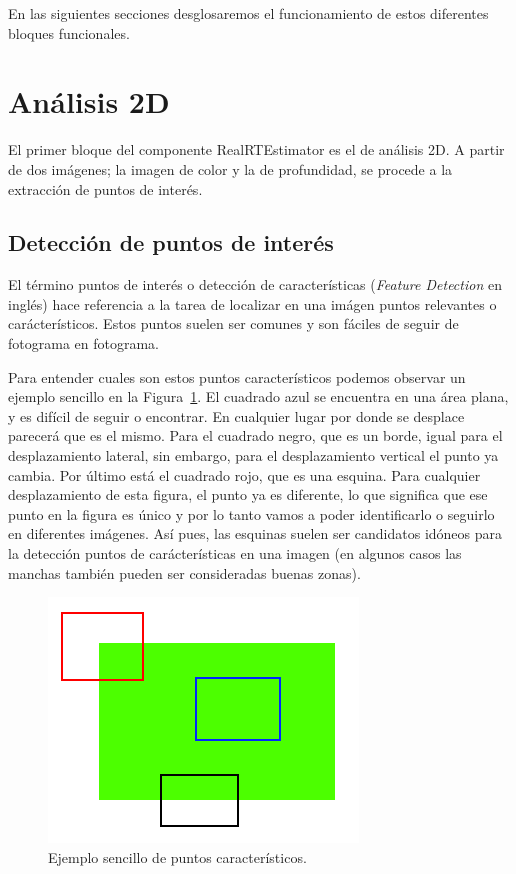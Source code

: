 En las siguientes secciones desglosaremos el funcionamiento de estos diferentes bloques funcionales.

\section{Análisis 2D}

El primer bloque del componente RealRTEstimator es el de análisis 2D. A partir de dos imágenes; la imagen de color y la de profundidad, se procede a la extracción de puntos de interés.

\subsection{Detección de puntos de interés}

El término puntos de interés o detección de características (\textit{Feature Detection} en inglés) hace referencia a la tarea de localizar en una imágen puntos relevantes o carácterísticos. Estos puntos suelen ser comunes y son fáciles de seguir de fotograma en fotograma.

Para entender cuales son estos puntos característicos podemos observar un ejemplo sencillo en la Figura~\ref{fig:feature_simple}. El cuadrado azul se encuentra en una área plana, y es difícil de seguir o encontrar. En cualquier lugar por donde se desplace parecerá que es el mismo. Para el cuadrado negro, que es un borde, igual para el desplazamiento lateral, sin embargo, para el desplazamiento vertical el punto ya cambia. Por último está el cuadrado rojo, que es una esquina. Para cualquier desplazamiento de esta figura, el punto ya es diferente, lo que significa que ese punto en la figura es único y por lo tanto vamos a poder identificarlo o seguirlo en diferentes imágenes. Así pues, las esquinas suelen ser candidatos idóneos para la detección puntos de carácterísticas en una imagen (en algunos casos las manchas también pueden ser consideradas buenas zonas).

\begin{figure}[!ht]
\centering
\includegraphics[scale=0.7]{Figures/feature_simple.png}
\decoRule
\caption[FeatureSimple]{Ejemplo sencillo de puntos característicos.}
\label{fig:feature_simple}
\end{figure}

